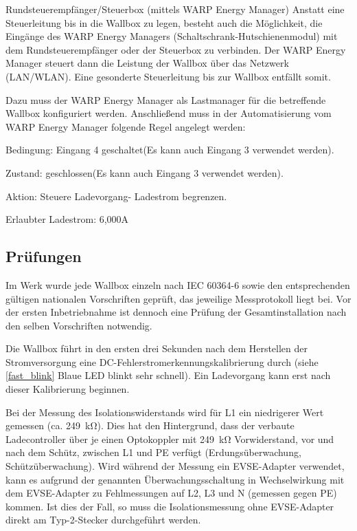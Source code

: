 \documentclass[a4paper,10pt]{article}
\begin{document}
\begin{multicols*}{2}
\begin{description}
        \item{Rundsteuerempfänger/Steuerbox (mittels WARP Energy Manager)}
        Anstatt eine Steuerleitung bis in die Wallbox zu legen, besteht auch die
        Möglichkeit, die Eingänge des WARP Energy Managers
        (Schaltschrank-Hutschienenmodul) mit dem Rundsteuerempfänger oder der
        Steuerbox zu verbinden. Der WARP Energy Manager steuert dann die
        Leistung der Wallbox über das Netzwerk (LAN/WLAN). Eine gesonderte
        Steuerleitung bis zur Wallbox entfällt somit.

		Dazu muss der WARP Energy Manager als Lastmanager für die betreffende
		Wallbox konfiguriert werden. Anschließend muss in der Automatisierung
		vom WARP Energy Manager folgende Regel angelegt werden:

		\begin{description}
			\item{Bedingung:} \glqq Eingang 4 geschaltet\grqq (Es kann auch Eingang 3 verwendet werden).
			\item{Zustand:} \glqq geschlossen\grqq (Es kann auch Eingang 3 verwendet werden).
			\item{Aktion:} \glqq Steuere Ladevorgang\grqq - \glqq Ladestrom begrenzen\grqq.
			\item{Erlaubter Ladestrom:} 6,000A
		\end{description}
    \end{description}


	\newpage
	\subsection{Prüfungen}\label{tests}
	Im Werk wurde jede Wallbox einzeln nach IEC 60364-6 sowie den entsprechenden gültigen
	nationalen Vorschriften geprüft, das jeweilige Messprotokoll liegt bei.
	Vor der ersten Inbetriebnahme ist dennoch eine Prüfung der Gesamtinstallation
	nach den selben Vorschriften notwendig.

	Die Wallbox führt in den ersten drei Sekunden nach dem Herstellen der Stromversorgung
	eine DC-Fehlerstromerkennungskalibrierung durch (siehe \ref{fast_blink} Blaue LED blinkt sehr schnell).
	Ein Ladevorgang kann erst nach dieser Kalibrierung beginnen.

	Bei der Messung des Isolationswiderstands wird für L1 ein niedrigerer Wert
	gemessen (ca. \SI{249}{\kilo\ohm}). Dies hat den Hintergrund, dass
	der verbaute Ladecontroller über je einen Optokoppler mit
	\SI{249}{\kilo\ohm} Vorwiderstand, vor und nach dem Schütz, zwischen L1 und
	PE verfügt (Erdungsüberwachung, Schützüberwachung). Wird während der Messung ein EVSE-Adapter verwendet,
	kann es aufgrund der genannten Überwachungsschaltung in Wechselwirkung mit dem EVSE-Adapter zu Fehlmessungen
	auf L2, L3 und N (gemessen gegen PE) kommen. Ist dies der Fall, so muss die Isolationsmessung
	ohne EVSE-Adapter direkt am Typ-2-Stecker durchgeführt werden.


\end{multicols*}
\end{document}
